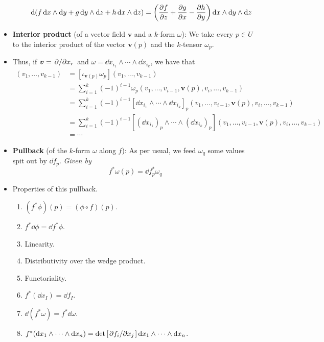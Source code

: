 \documentclass[../notes.tex]{subfiles}
\begin{document}
\begin{itemize}
\begin{itemize}
        \begin{equation*}
            \dd(f\dd{x}\wedge\dd{y}+g\dd{y}\wedge\dd{z}+h\dd{x}\wedge\dd{z}) = \left( \pdv{f}{z}+\pdv{g}{x}-\pdv{h}{y} \right)\dd{x}\wedge\dd{y}\wedge\dd{z}
        \end{equation*}
    \end{itemize}
    \item \textbf{Interior product} (of a vector field $\bm{v}$ and a $k$-form $\omega$): We take every $p\in U$ to the interior product of the vector $\bm{v}(p)$ and the $k$-tensor $\omega_p$.
    \item Thus, if $\bm{v}=\pdv*{x_r}$ and $\omega=\dd{x_{i_1}}\wedge\cdots\wedge\dd{x_{i_k}}$, we have that
    \begin{align*}
        [\iota_{\bm{v}}\omega(p)](v_1,\dots,v_{k-1}) &= [\iota_{\bm{v}(p)}\omega_p](v_1,\dots,v_{k-1})\\
        &= \sum_{i=1}^k(-1)^{i-1}\omega_p(v_1,\dots,v_{i-1},\bm{v}(p),v_i,\dots,v_{k-1})\\
        &= \sum_{i=1}^k(-1)^{i-1}[\dd{x_{i_1}}\wedge\cdots\wedge\dd{x_{i_k}}]_p(v_1,\dots,v_{i-1},\bm{v}(p),v_i,\dots,v_{k-1})\\
        &= \sum_{i=1}^k(-1)^{i-1}[(\dd{x_{i_1}})_p\wedge\cdots\wedge(\dd{x_{i_k}})_p](v_1,\dots,v_{i-1},\bm{v}(p),v_i,\dots,v_{k-1})\\
        &= \cdots
    \end{align*}
    \item \textbf{Pullback} (of the $k$-form $\omega$ along $f$): As per usual, we feed $\omega_q$ some values spit out by $\dd f_p$. \emph{Given by}
    \begin{equation*}
        f^*\omega(p) = \dd f_p^*\omega_q
    \end{equation*}
    \item Properties of this pullback.
    \begin{enumerate}
        \item $(f^*\phi)(p)=(\phi\circ f)(p)$.
        \item $f^*\dd\phi=\dd f^*\phi$.
        \item Linearity.
        \item Distributivity over the wedge product.
        \item Functoriality.
        \item $f^*(\dd x_I)=\dd f_I$.
        \item $\dd(f^*\omega)=f^*\dd\omega$.
        \item $f^*(\dd x_1\wedge\cdots\wedge\dd x_n)=\det\left[ \pdv*{f_i}{x_j} \right]\dd{x_1}\wedge\cdots\wedge\dd{x_n}$.

\end{enumerate}
\end{itemize}
\end{document}
